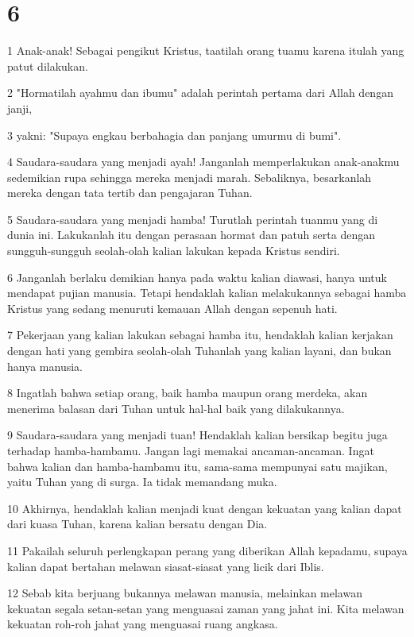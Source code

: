 \chapter{6}

\par 1 Anak-anak! Sebagai pengikut Kristus, taatilah orang tuamu karena itulah yang patut dilakukan.
\par 2 "Hormatilah ayahmu dan ibumu" adalah perintah pertama dari Allah dengan janji,
\par 3 yakni: "Supaya engkau berbahagia dan panjang umurmu di bumi".
\par 4 Saudara-saudara yang menjadi ayah! Janganlah memperlakukan anak-anakmu sedemikian rupa sehingga mereka menjadi marah. Sebaliknya, besarkanlah mereka dengan tata tertib dan pengajaran Tuhan.
\par 5 Saudara-saudara yang menjadi hamba! Turutlah perintah tuanmu yang di dunia ini. Lakukanlah itu dengan perasaan hormat dan patuh serta dengan sungguh-sungguh seolah-olah kalian lakukan kepada Kristus sendiri.
\par 6 Janganlah berlaku demikian hanya pada waktu kalian diawasi, hanya untuk mendapat pujian manusia. Tetapi hendaklah kalian melakukannya sebagai hamba Kristus yang sedang menuruti kemauan Allah dengan sepenuh hati.
\par 7 Pekerjaan yang kalian lakukan sebagai hamba itu, hendaklah kalian kerjakan dengan hati yang gembira seolah-olah Tuhanlah yang kalian layani, dan bukan hanya manusia.
\par 8 Ingatlah bahwa setiap orang, baik hamba maupun orang merdeka, akan menerima balasan dari Tuhan untuk hal-hal baik yang dilakukannya.
\par 9 Saudara-saudara yang menjadi tuan! Hendaklah kalian bersikap begitu juga terhadap hamba-hambamu. Jangan lagi memakai ancaman-ancaman. Ingat bahwa kalian dan hamba-hambamu itu, sama-sama mempunyai satu majikan, yaitu Tuhan yang di surga. Ia tidak memandang muka.
\par 10 Akhirnya, hendaklah kalian menjadi kuat dengan kekuatan yang kalian dapat dari kuasa Tuhan, karena kalian bersatu dengan Dia.
\par 11 Pakailah seluruh perlengkapan perang yang diberikan Allah kepadamu, supaya kalian dapat bertahan melawan siasat-siasat yang licik dari Iblis.
\par 12 Sebab kita berjuang bukannya melawan manusia, melainkan melawan kekuatan segala setan-setan yang menguasai zaman yang jahat ini. Kita melawan kekuatan roh-roh jahat yang menguasai ruang angkasa.
